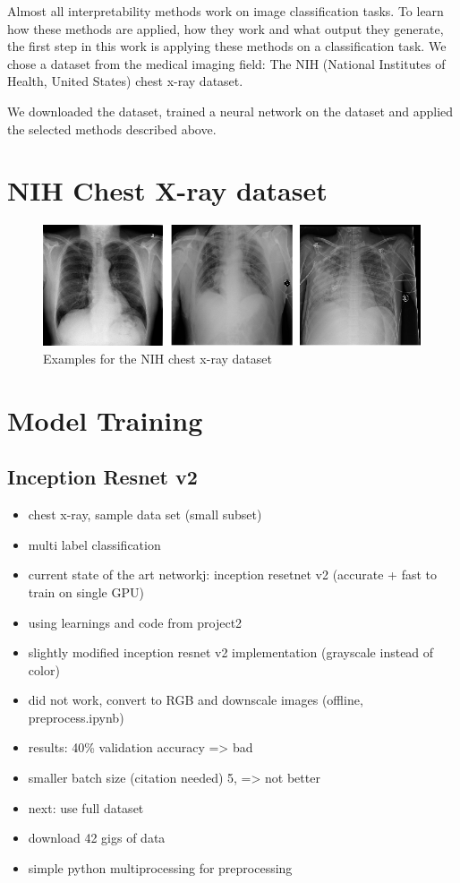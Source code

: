 Almost all interpretability methods work on image classification tasks. To learn how these methods are applied, how they work and what output they generate, the first step in this work is applying these methods on a classification task. We chose a dataset from the medical imaging field: The NIH (National Institutes of Health, United States) chest x-ray dataset.

We downloaded the dataset, trained a neural network on the dataset and applied the selected methods described above.

\section{NIH Chest X-ray dataset}
\begin{figure}[h]
\centering
\caption{Examples for the NIH chest x-ray dataset}
\includegraphics[width=14cm]{chapters/03_classification/images/chest-x-ray.png}
\end{figure}

\section{Model Training}


\subsection{Inception Resnet v2}


\begin{itemize}
    \item  chest x-ray, sample data set (small subset)
    \item  multi label classification
    \item  current state of the art networkj: inception  resetnet v2 (accurate + fast to train on single GPU) \cite{todo}
    \item  using learnings and code from project2
    \item  slightly modified inception resnet v2 implementation (grayscale instead of color)
    \item  did not work, convert to RGB and downscale images (offline, preprocess.ipynb)
    \item  results: 40\% validation accuracy => bad
    \item smaller batch size (citation needed) 5, => not better
    \item next: use full dataset
    \item download 42 gigs of data
    \item simple python multiprocessing for preprocessing
\end{itemize}

